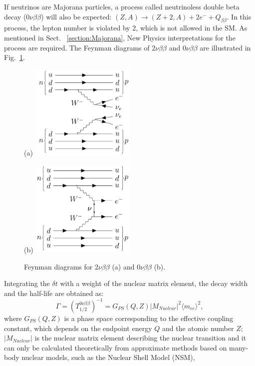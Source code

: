 If neutrinos are Majorana particles, a process called neutrinoless double beta decay ($0\nu\beta\beta$) will also be expected: $(Z,A) \to (Z+2,A)+2e^{-}+Q_{\beta\beta}$. In this process, the lepton number is violated by 2, which is not allowed in the SM. As mentioned in Sect.~ \ref{section:Majorana}, New Physics interpretations for the process are required. The Feynman diagrams of $2\nu\beta\beta$ and $0\nu\beta\beta$ are illustrated in Fig.~\ref{feynman1}.
\begin{figure}[htbp]
	\centering
	{	
		\begin{minipage}[t]{0.45\textwidth}{(a)}
			\includegraphics[width=5cm]{doubleBeta2nu_feynman.png}
		\end{minipage}
		\begin{minipage}[t]{0.45\textwidth}{(b)}
			\includegraphics[width=5cm]{doubleBeta_feynman.png}
		\end{minipage}
		\caption{ Feynman diagrams for $2\nu\beta\beta$ (a) and $0\nu\beta\beta$ (b).}
		\label{feynman1}
	}
\end{figure}

Integrating the $\delta t$ with a weight of the nuclear matrix element, the decay width and the half-life are obtained as\cite{suekane2015neutrino,zuber2020neutrino}:
\begin{equation}
\Gamma=(T^{0\nu\beta\beta}_{1/2})^{-1} = G_{PS}(Q,Z)|M_{Nuclear}|^2\langle m_{ee}\rangle^2, 
\end{equation}
where $G_{PS}(Q,Z)$ is a phase space corresponding to the effective coupling constant, which depends on the endpoint energy $Q$ and the atomic number $Z$; $|M_{Nuclear}|$ is the nuclear matrix element describing the nuclear transition and it can only be calculated theoretically from approximate methods based on many-body nuclear models, such as the Nuclear Shell Model (NSM),

